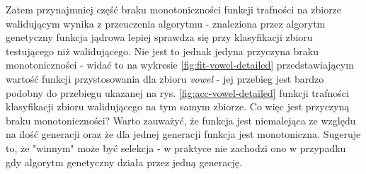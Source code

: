 %	
%	
%	
%
%	
%	
%		
%	

	\FloatBarrier
	Zatem przynajmniej część braku monotoniczności funkcji trafności na zbiorze walidującym wynika z przeuczenia algorytmu - znaleziona przez algorytm genetyczny funkcja jądrowa lepiej sprawdza się przy klasyfikacji zbioru testującego niż walidującego. Nie jest to jednak jedyna przyczyna braku monotoniczności - widać to na wykresie \ref{fig:fit-vowel-detailed} przedstawiającym wartość funkcji przystosowania dla zbioru \emph{vowel} - jej przebieg jest bardzo podobny do przebiegu ukazanej na rys. \ref{fig:acc-vowel-detailed} funkcji trafności klasyfikacji zbioru walidującego na tym samym zbiorze. Co więc jest przyczyną braku monotoniczności? Warto zauważyć, że funkcja jest niemalejąca ze względu na ilość generacji oraz że dla jednej generacji funkcja jest monotoniczna. Sugeruje to, że "winnym" może być selekcja - w praktyce nie zachodzi ono w przypadku gdy algorytm genetyczny działa przez jedną generację.

